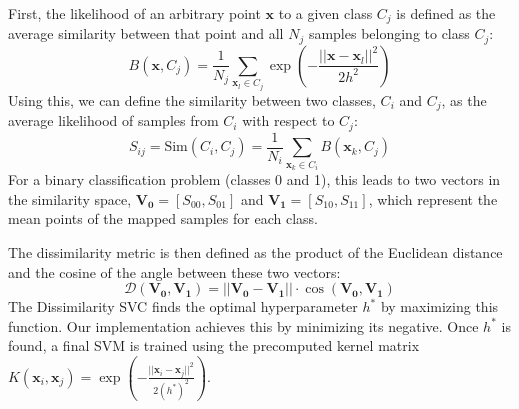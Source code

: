 \documentclass[conference]{IEEEtran}
\begin{document}
First, the likelihood of an arbitrary point $\mathbf{x}$ to a given class $C_j$ is defined as the average similarity between that point and all $N_j$ samples belonging to class $C_j$:
\begin{equation}
    B(\mathbf{x}, C_j) = \frac{1}{N_j} \sum_{\mathbf{x}_l \in C_j} \exp\left(-\frac{||\mathbf{x} - \mathbf{x}_l||^2}{2h^2}\right)
\end{equation}
Using this, we can define the similarity between two classes, $C_i$ and $C_j$, as the average likelihood of samples from $C_i$ with respect to $C_j$:
\begin{equation}
    S_{ij} = \text{Sim}(C_i, C_j) = \frac{1}{N_i} \sum_{\mathbf{x}_k \in C_i} B(\mathbf{x}_k, C_j)
\end{equation}
For a binary classification problem (classes 0 and 1), this leads to two vectors in the similarity space, $\mathbf{V_0} = [S_{00}, S_{01}]$ and $\mathbf{V_1} = [S_{10}, S_{11}]$, which represent the mean points of the mapped samples for each class.

The dissimilarity metric is then defined as the product of the Euclidean distance and the cosine of the angle between these two vectors:
\begin{equation}
    \mathcal{D}(\mathbf{V_0}, \mathbf{V_1}) = ||\mathbf{V_0} - \mathbf{V_1}|| \cdot \cos(\mathbf{V_0}, \mathbf{V_1})
\end{equation}
The Dissimilarity SVC finds the optimal hyperparameter $h^*$ by maximizing this function. Our implementation achieves this by minimizing its negative. Once $h^*$ is found, a final SVM is trained using the precomputed kernel matrix $K(\mathbf{x}_i, \mathbf{x}_j) = \exp(-\frac{||\mathbf{x}_i - \mathbf{x}_j||^2}{2(h^*)^2})$.
\end{document}
